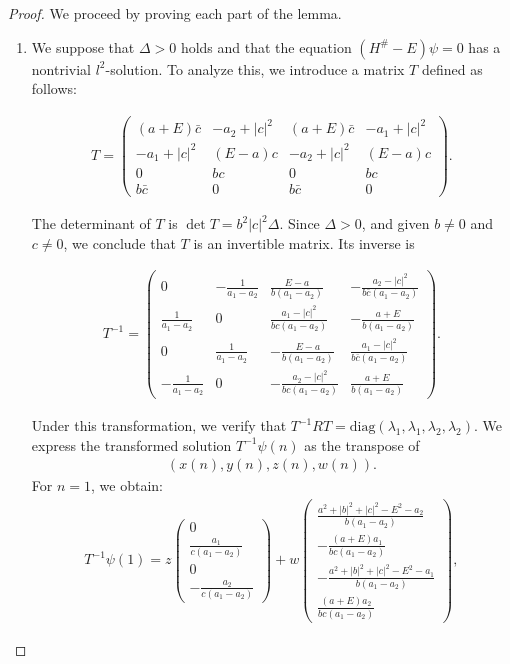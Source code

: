 \documentclass{amsart}
\theoremstyle{definition}
\theoremstyle{remark}
\begin{document}
\begin{proof}
We proceed by proving each part of the lemma.

\begin{enumerate}
    \item We suppose that \(\Delta > 0\) holds and that the equation \((H^\# - E)\psi = 0\) has a nontrivial \(l^2\)-solution. To analyze this, we introduce a matrix \(T\) defined as follows:

    \begin{align*}
    T = \begin{pmatrix}
    (a + E)\bar{c} & -a_2 + |c|^2 & (a + E)\bar{c} & -a_1 + |c|^2 \\
    -a_1 + |c|^2 & (E - a)c & -a_2 + |c|^2 & (E - a)c \\
    0 & bc & 0 & bc \\
    b\bar{c} & 0 & b\bar{c} & 0
    \end{pmatrix}.
    \end{align*}

    The determinant of \(T\) is \(\det T = b^2 |c|^2 \Delta\). Since \(\Delta > 0\), and given \(b \neq 0\) and \(c \neq 0\), we conclude that \(T\) is an invertible matrix. Its inverse is

    \begin{align*}
    T^{-1} = \begin{pmatrix}
    0 & -\frac{1}{a_1 - a_2} & \frac{E - a}{b (a_1 - a_2)} & -\frac{a_2 - |c|^2}{b \bar{c} (a_1 - a_2)} \\
    \frac{1}{a_1 - a_2} & 0 & \frac{a_1 - |c|^2}{b c (a_1 - a_2)} & -\frac{a + E}{b (a_1 - a_2)} \\
    0 & \frac{1}{a_1 - a_2} & -\frac{E - a}{b (a_1 - a_2)} & \frac{a_1 - |c|^2}{b \bar{c} (a_1 - a_2)} \\
    -\frac{1}{a_1 - a_2} & 0 & -\frac{a_2 - |c|^2}{b c (a_1 - a_2)} & \frac{a + E}{b (a_1 - a_2)}
    \end{pmatrix}.
    \end{align*}

    Under this transformation, we verify that \(T^{-1} R T = \text{diag}(\lambda_1, \lambda_1, \lambda_2, \lambda_2)\). We express the transformed solution \(T^{-1} \psi(n)\) as the transpose of
\begin{align*}
(x(n), y(n), z(n), w(n)).
\end{align*}
For \(n = 1\), we obtain:
    \begin{align*}
    T^{-1} \psi(1) = z \begin{pmatrix} 0 \\ \frac{a_1}{c (a_1 - a_2)} \\ 0 \\ -\frac{a_2}{c (a_1 - a_2)} \end{pmatrix} +
    w \begin{pmatrix} \frac{a^2 + |b|^2 + |c|^2 - E^2 - a_2}{b (a_1 - a_2)} \\ -\frac{(a + E) a_1}{b c (a_1 - a_2)} \\ -\frac{a^2 + |b|^2 + |c|^2 - E^2 - a_1}{b (a_1 - a_2)} \\ \frac{(a + E) a_2}{b c (a_1 - a_2)} \end{pmatrix},
    \end{align*}


\end{enumerate}
\end{proof}
\end{document}
